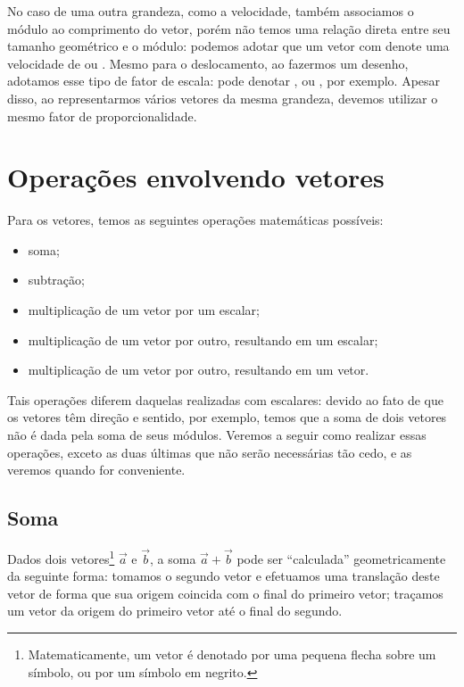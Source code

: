 No caso de uma outra grandeza, como a velocidade, também associamos o módulo ao comprimento do vetor, porém não temos uma relação direta entre seu tamanho geométrico e o módulo: podemos adotar que um vetor com  denote uma velocidade de  ou . Mesmo para o deslocamento, ao fazermos um desenho, adotamos esse tipo de fator de escala:  pode denotar , ou , por exemplo. Apesar disso, ao representarmos vários vetores da mesma grandeza, devemos utilizar o mesmo fator de proporcionalidade.

\section{Operações envolvendo vetores}

Para os vetores, temos as seguintes operações matemáticas possíveis:
\begin{itemize}
    \item soma;
    \item subtração;
    \item multiplicação de um vetor por um escalar;
    \item multiplicação de um vetor por outro, resultando em um escalar;
    \item multiplicação de um vetor por outro, resultando em um vetor.
\end{itemize}

Tais operações diferem daquelas realizadas com escalares: devido ao fato de que os vetores têm direção e sentido, por exemplo, temos que a soma de dois vetores não é dada pela soma de seus módulos. Veremos a seguir como realizar essas operações, exceto as duas últimas que não serão necessárias tão cedo, e as veremos quando for conveniente.

\subsection{Soma}

Dados dois vetores\footnote{Matematicamente, um vetor é denotado por uma pequena flecha sobre um símbolo, ou por um símbolo em negrito.} $\vec{a}$ e $\vec{b}$, a soma $\vec{a}+\vec{b}$ pode ser ``calculada'' geometricamente da seguinte forma: tomamos o segundo vetor e efetuamos uma translação deste vetor de forma que sua origem coincida com o final do primeiro vetor; traçamos um vetor da origem do primeiro vetor até o final do segundo. 

